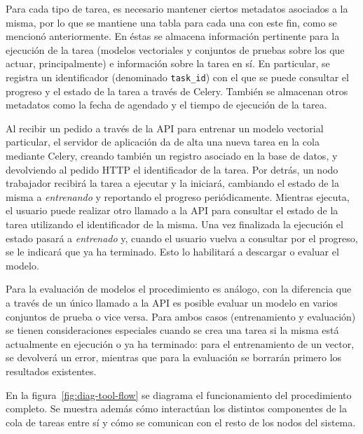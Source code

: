 Para cada tipo de tarea, es necesario mantener ciertos metadatos asociados a la misma, por lo que se
mantiene una tabla para cada una con este fin, como se mencionó anteriormente. En éstas se almacena
información pertinente para la ejecución de la tarea (modelos vectoriales y conjuntos de pruebas
sobre los que actuar, principalmente) e información sobre la tarea en sí. En particular, se registra
un identificador (denominado \texttt{task\_id}) con el que se puede consultar el progreso y el
estado de la tarea a través de Celery. También se almacenan otros metadatos como la fecha de
agendado y el tiempo de ejecución de la tarea.

Al recibir un pedido a través de la API para entrenar un modelo vectorial particular, el servidor de
aplicación da de alta una nueva tarea en la cola mediante Celery, creando también un registro
asociado en la base de datos, y devolviendo al pedido HTTP el identificador de la tarea. Por detrás,
un nodo trabajador recibirá la tarea a ejecutar y la iniciará, cambiando el estado de la misma a
\textit{entrenando} y reportando el progreso periódicamente. Mientras ejecuta, el usuario puede
realizar otro llamado a la API para consultar el estado de la tarea utilizando el identificador de
la misma. Una vez finalizada la ejecución el estado pasará a \textit{entrenado} y, cuando el
usuario vuelva a consultar por el progreso, se le indicará que ya ha terminado. Esto lo habilitará a
descargar o evaluar el modelo.

Para la evaluación de modelos el procedimiento es análogo, con la diferencia que a través de un
único llamado a la API es posible evaluar un modelo en varios conjuntos de prueba o vice versa.
Para ambos casos (entrenamiento y evaluación) se tienen consideraciones especiales cuando se crea
una tarea si la misma está actualmente en ejecución o ya ha terminado: para el entrenamiento de un
vector, se devolverá un error, mientras que para la evaluación se borrarán primero los resultados
existentes.

En la figura~\ref{fig:diag-tool-flow} se diagrama el funcionamiento del procedimiento completo. Se
muestra además cómo interactúan los distintos componentes de la cola de tareas entre sí y cómo se
comunican con el resto de los nodos del sistema.

